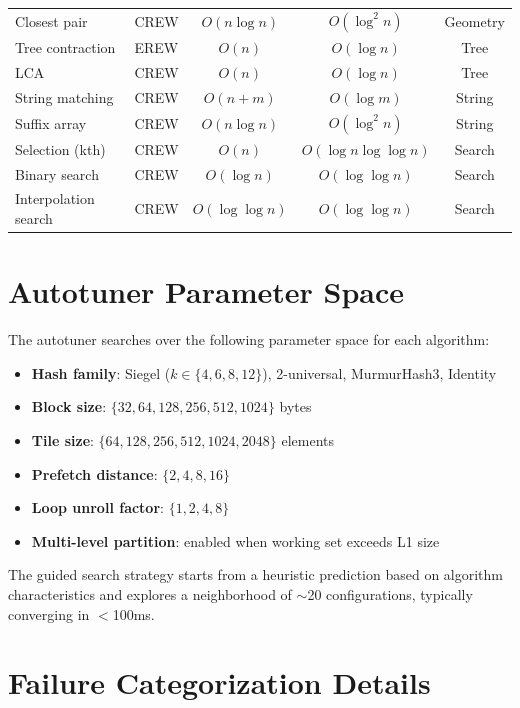 \documentclass[11pt]{article}
\begin{document}
\begin{table}[h]
\begin{tabular}{@{}llccc@{}}
Closest pair & CREW & $O(n\log n)$ & $O(\log^2 n)$ & Geometry \\
Tree contraction & EREW & $O(n)$ & $O(\log n)$ & Tree \\
LCA & CREW & $O(n)$ & $O(\log n)$ & Tree \\
String matching & CREW & $O(n+m)$ & $O(\log m)$ & String \\
Suffix array & CREW & $O(n\log n)$ & $O(\log^2 n)$ & String \\
Selection (kth) & CREW & $O(n)$ & $O(\log n\log\log n)$ & Search \\
Binary search & CREW & $O(\log n)$ & $O(\log\log n)$ & Search \\
Interpolation search & CREW & $O(\log\log n)$ & $O(\log\log n)$ & Search \\
\bottomrule
\end{tabular}
\end{table}


\section{Autotuner Parameter Space}
\label{app:autotuner}

The autotuner searches over the following parameter space for each
algorithm:

\begin{itemize}
\item \textbf{Hash family}: Siegel ($k \in \{4, 6, 8, 12\}$),
  2-universal, MurmurHash3, Identity
\item \textbf{Block size}: $\{32, 64, 128, 256, 512, 1024\}$ bytes
\item \textbf{Tile size}: $\{64, 128, 256, 512, 1024, 2048\}$ elements
\item \textbf{Prefetch distance}: $\{2, 4, 8, 16\}$
\item \textbf{Loop unroll factor}: $\{1, 2, 4, 8\}$
\item \textbf{Multi-level partition}: enabled when working set exceeds
  L1 size
\end{itemize}

The guided search strategy starts from a heuristic prediction based on
algorithm characteristics and explores a neighborhood of $\sim$20
configurations, typically converging in $<$100ms.


\section{Failure Categorization Details}
\label{app:failures}
\end{document}
